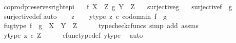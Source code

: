 \begin{isabellebody}
\isamarkupfalse%
%
\endisatagproof
{\isafoldproof}%
%
\isadelimproof
\isanewline
%
\endisadelimproof
\isanewline
{}\isamarkupfalse%
\ coprod{\isacharunderscore}{\kern0pt}preserves{\isacharunderscore}{\kern0pt}right{\isacharunderscore}{\kern0pt}epi{\isacharcolon}{\kern0pt}\isanewline
\ \ \ {\isachardoublequoteopen}f{\isacharcolon}{\kern0pt}\ X\ {\isasymrightarrow}\ Z{\isachardoublequoteclose}\ {\isachardoublequoteopen}g{\isacharcolon}{\kern0pt}\ Y\ {\isasymrightarrow}\ Z{\isachardoublequoteclose}\isanewline
\ \ \ {\isachardoublequoteopen}surjective{\isacharparenleft}{\kern0pt}g{\isacharparenright}{\kern0pt}{\isachardoublequoteclose}\isanewline
\ \ \ {\isachardoublequoteopen}surjective{\isacharparenleft}{\kern0pt}f\ {\isasymamalg}\ g{\isacharparenright}{\kern0pt}{\isachardoublequoteclose}\isanewline
%
\isadelimproof
\ \ %
\endisadelimproof
%
\isatagproof
{}\isamarkupfalse%
\ surjective{\isacharunderscore}{\kern0pt}def\isanewline
{}\isamarkupfalse%
{\isacharparenleft}{\kern0pt}auto{\isacharparenright}{\kern0pt}\isanewline
\ \ \isamarkupfalse%
\ z\isanewline
\ \ \isamarkupfalse%
\ y{\isacharunderscore}{\kern0pt}type{\isacharcolon}{\kern0pt}\ {\isachardoublequoteopen}z\ {\isasymin}\isactrlsub c\ codomain\ {\isacharparenleft}{\kern0pt}f\ {\isasymamalg}\ g{\isacharparenright}{\kern0pt}{\isachardoublequoteclose}\isanewline
\ \ \isamarkupfalse%
\ fug{\isacharunderscore}{\kern0pt}type{\isacharcolon}{\kern0pt}\ {\isachardoublequoteopen}{\isacharparenleft}{\kern0pt}f\ {\isasymamalg}\ g{\isacharparenright}{\kern0pt}\ {\isacharcolon}{\kern0pt}\ {\isacharparenleft}{\kern0pt}X\ {\isasymCoprod}\ Y{\isacharparenright}{\kern0pt}\ {\isasymrightarrow}\ Z{\isachardoublequoteclose}\isanewline
\ \ \ \ \isamarkupfalse%
\ {\isacharparenleft}{\kern0pt}typecheck{\isacharunderscore}{\kern0pt}cfuncs{\isacharcomma}{\kern0pt}\ simp\ add{\isacharcolon}{\kern0pt}\ assms{\isacharparenright}{\kern0pt}\isanewline
\ \ \isamarkupfalse%
\ \isamarkupfalse%
\ y{\isacharunderscore}{\kern0pt}type{}{\isacharcolon}{\kern0pt}\ {\isachardoublequoteopen}z\ {\isasymin}\isactrlsub c\ Z{\isachardoublequoteclose}\isanewline
\ \ \ \ \isamarkupfalse%
\ cfunc{\isacharunderscore}{\kern0pt}type{\isacharunderscore}{\kern0pt}def\ y{\isacharunderscore}{\kern0pt}type\ \isamarkupfalse%
\ auto\isanewline
\ \ \isamarkupfalse%
\ \isamarkupfalse%

\end{isabellebody}
